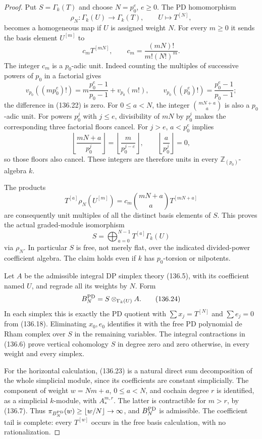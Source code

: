 \documentclass[11pt,a4paper]{article}
\theoremstyle{definition}\newtheorem{definition}[theorem]{Definition}
\theoremstyle{remark}\newtheorem{remark}[theorem]{Remark}
\begin{document}
\begin{proof}
Put $S=\Gamma_k(T)$ and choose $N=p_0^e$, $e\geq0$.
The PD homomorphism
\[
 \rho_N:\Gamma_k(U)\longrightarrow\Gamma_k(T),
                  \qquad U\longmapsto T^{[N]},              \tag{136.21}
\]
becomes a homogeneous map if $U$ is assigned weight $N$.
For every $m\geq0$ it sends the basis element $U^{[m]}$ to
\[
 c_mT^{[mN]},\qquad c_m=\frac{(mN)!}{m!(N!)^m}.
                                                               \tag{136.22}
\]
The integer $c_m$ is a $p_0$-adic unit.  Indeed counting the
multiples of successive powers of $p_0$ in a factorial gives
\[
 v_{p_0}((mp_0^e)!)
  =m\frac{p_0^e-1}{p_0-1}+v_{p_0}(m!),
 \qquad
 v_{p_0}((p_0^e)!)=\frac{p_0^e-1}{p_0-1};
\]
the difference in (136.22) is zero.
For $0\leq a<N$, the integer
$\binom{mN+a}{a}$ is also a $p_0$-adic unit.
For powers $p_0^j$ with $j\leq e$, divisibility of $mN$
by $p_0^j$ makes the corresponding three factorial floors
cancel.  For $j>e$, $a<p_0^e$ implies
\[
 \left\lfloor\frac{mN+a}{p_0^j}\right\rfloor
  =\left\lfloor\frac{m}{p_0^{j-e}}\right\rfloor,
 \qquad \left\lfloor\frac a{p_0^j}\right\rfloor=0,
\]
so those floors also cancel.  These integers are therefore
units in every $\mathbb Z_{(p_0)}$-algebra $k$.

The products
\[
 T^{[a]}\rho_N(U^{[m]})
    =c_m\binom{mN+a}{a}T^{[mN+a]}
\]
are consequently unit multiples of all the distinct basis
elements of $S$.  This proves the actual graded-module
isomorphism
\[
 S=\bigoplus_{a=0}^{N-1}T^{[a]}\Gamma_k(U)                 \tag{136.23}
\]
via $\rho_N$.  In particular $S$ is free, not merely flat,
over the indicated divided-power coefficient algebra.
The claim holds even if $k$ has $p_0$-torsion or nilpotents.

Let $A$ be the admissible integral DP simplex theory
(136.5), with its coefficient named $U$, and regrade
all its weights by $N$.  Form
\[
 B_N^{\rm PD}=S\otimes_{\Gamma_k(U)}A .                    \tag{136.24}
\]
In each simplex this is exactly the PD quotient with
$\sum x_j=T^{[N]}$ and $\sum e_j=0$ from (136.18).
Eliminating $x_0,e_0$ identifies it with the free PD
polynomial de Rham complex over $S$ in the remaining
variables.  The integral contractions in (136.6) prove
vertical cohomology $S$ in degree zero and zero otherwise,
in every weight and every simplex.

For the horizontal calculation, (136.23) is a natural
direct sum decomposition of the whole simplicial module,
since its coefficients are constant simplicially.
The component of weight $w=Nm+a$, $0\leq a<N$, and
cochain degree $r$ is identified, as a simplicial
$k$-module, with $A_*^{m,r}$.  The latter is contractible
for $m>r$, by (136.7).  Thus
$\pi_{B_N^{\rm PD}}(w)\geq\lfloor w/N\rfloor\to\infty$,
and $B_N^{\rm PD}$ is admissible.  The coefficient tail
is complete: every $T^{[w]}$ occurs in the free basis
calculation, with no rationalization.


\end{proof}
\end{document}
